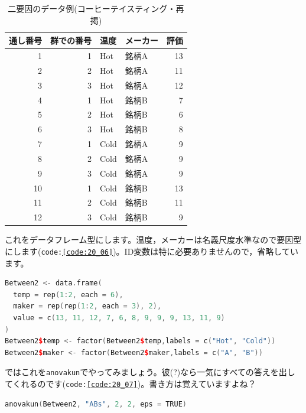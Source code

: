 \documentclass{ltjbook}
\begin{document}
\begin{table}[ht]
	\centering
	\caption{二要因のデータ例(コーヒーテイスティング・再掲)}
	\begin{tabular}{rrllr}
		\hline
		通し番号 & 群での番号 & 温度   & メーカー & 評価 \\
		\hline
		1    & 1     & Hot  & 銘柄A  & 13 \\
		2    & 2     & Hot  & 銘柄A  & 11 \\
		3    & 3     & Hot  & 銘柄A  & 12 \\
		4    & 1     & Hot  & 銘柄B  & 7  \\
		5    & 2     & Hot  & 銘柄B  & 6  \\
		6    & 3     & Hot  & 銘柄B  & 8  \\
		7    & 1     & Cold & 銘柄A  & 9  \\
		8    & 2     & Cold & 銘柄A  & 9  \\
		9    & 3     & Cold & 銘柄A  & 9  \\
		10   & 1     & Cold & 銘柄B  & 13 \\
		11   & 2     & Cold & 銘柄B  & 11 \\
		12   & 3     & Cold & 銘柄B  & 9  \\
		\hline
	\end{tabular}

	\label{tbl:20_04}
\end{table}
これをデータフレーム型にします。温度，メーカーは名義尺度水準なので要因型にします(\texttt{code:\ref{code:20_06}})。ID変数は特に必要ありませんので，省略しています。
\begin{lstlisting}[language=c++,label={code:20_06},caption={データフレームにする}]
Between2 <- data.frame(
  temp = rep(1:2, each = 6),
  maker = rep(rep(1:2, each = 3), 2),
  value = c(13, 11, 12, 7, 6, 8, 9, 9, 9, 13, 11, 9)
)
Between2$temp <- factor(Between2$temp,labels = c("Hot", "Cold"))
Between2$maker <- factor(Between2$maker,labels = c("A", "B"))
\end{lstlisting}


ではこれを\texttt{anovakun}でやってみましょう。彼(?)なら一気にすべての答えを出してくれるのです(\texttt{code:\ref{code:20_07}})。書き方は覚えていますよね？

\begin{lstlisting}[language=c++,label={code:20_07},caption={anovakunで実行}]
anovakun(Between2, "ABs", 2, 2, eps = TRUE)
\end{lstlisting}
\end{document}

